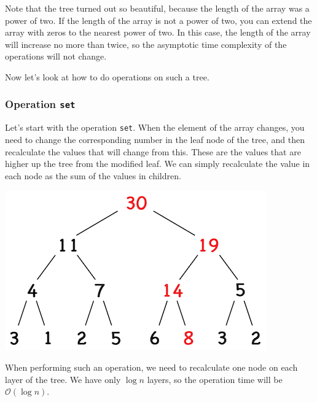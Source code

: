 \documentclass[11pt]{article}
\begin{document}
Note that the tree turned out so beautiful, because the length of the array was a power of
two. If the length of the array is not a power of two, you can extend the array with zeros to the
nearest power of two. In this case, the length of the array will increase no more than twice, so
the asymptotic time complexity of the operations will not change.

Now let's look at how to do operations on such a tree.

\subsubsection{Operation \texttt{set}}
\label{sec:org4d3446e}
Let's start with the operation \texttt{set}. When the element of the array changes, you need to change
the corresponding number in the leaf node of the tree, and then recalculate the values that will
change from this. These are the values that are higher up the tree from the modified leaf. We
can simply recalculate the value in each node as the sum of the values in children.
\begin{center}
\includegraphics[width=.9\linewidth]{./images/segment-tree-3.png}
\end{center}

When performing such an operation, we need to recalculate one node on each layer of the tree. We
have only \(\log n\) layers, so the operation time will be \(\mathcal{O}(\log n)\).
\end{document}
